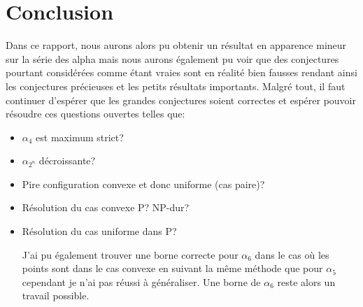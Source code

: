 \section{Conclusion}

Dans ce rapport, nous aurons alors pu obtenir un résultat en apparence mineur sur la série des alpha mais nous aurons également pu voir que des conjectures pourtant considérées comme étant vraies sont en réalité bien fausses rendant ainsi les conjectures précieuses et les petits résultats importants. Malgré tout, il faut continuer d'espérer que les grandes conjectures soient correctes et espérer pouvoir résoudre ces questions ouvertes telles que:

\begin{itemize}

\item $\alpha_4$ est maximum strict?
\item $\alpha_{2^n}$ décroissante?
\item Pire configuration convexe et donc uniforme (cas paire)?
\item Résolution du cas convexe P? NP-dur?
\item Résolution du cas uniforme dans P?

J'ai pu également trouver une borne correcte pour $\alpha_6$ dans le cas où les points sont dans le cas convexe en suivant la même méthode que pour $\alpha_5$ cependant je n'ai pas réussi à généraliser. Une borne de $\alpha_6$ reste alors un travail possible.

\end{itemize}